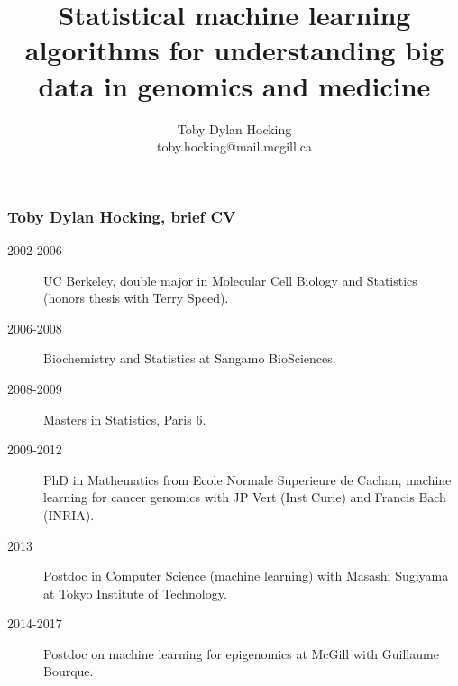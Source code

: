 \documentclass{beamer}
\begin{document}
\title{Statistical machine 
learning algorithms for 
understanding big data in
  genomics and medicine}

\author{
  Toby Dylan Hocking\\
  toby.hocking@mail.mcgill.ca
}

\maketitle

\begin{frame}
  \frametitle{Toby Dylan Hocking, brief CV}
  \begin{description}
  \item[2002-2006] UC Berkeley, double major in Molecular Cell Biology
    and Statistics (honors thesis with Terry Speed).
  \item[2006-2008] Biochemistry and Statistics at Sangamo BioSciences.
  \item[2008-2009] Masters in Statistics, Paris 6.
  \item[2009-2012] PhD in Mathematics from Ecole Normale Superieure de
    Cachan, machine learning for cancer genomics with JP Vert (Inst Curie)
    and Francis Bach (INRIA).
  \item[2013] Postdoc in Computer Science (machine learning) with Masashi Sugiyama at Tokyo
    Institute of Technology.
  \item[2014-2017] Postdoc on machine learning for epigenomics
    at McGill with Guillaume Bourque.
  \end{description}
\end{frame}
\end{document}
